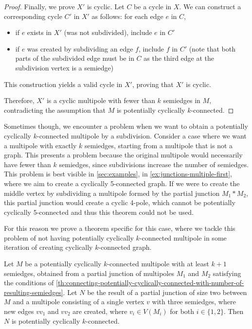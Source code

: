 \documentclass[12pt, twoside]{book}
\begin{document}
\begin{proof}
	Finally, we prove $X'$ is cyclic. Let $C$ be a cycle in $X$. We can construct a corresponding cycle $C'$ in $X'$ as follows: for each edge $e$ in $C$,
	\begin{itemize}
		\item if $e$ exists in $X'$ (was not subdivided), include $e$ in $C'$
		\item if $e$ was created by subdividing an edge $f$, include $f$ in $C'$ (note that both parts of the subdivided edge must be in $C$ as the third edge at the subdivision vertex is a semiedge)
	\end{itemize}
	This construction yields a valid cycle in $X'$, proving that $X'$ is cyclic.
	
	Therefore, $X'$ is a cyclic multipole with fewer than $k$ semiedges in $M$, contradicting the assumption that $M$ is potentially cyclically $k$-connected.
\end{proof}

Sometimes though, we encounter a problem when we want to obtain a potentially cyclically $k$-connected multipole by a subdivision. Consider a case where we want a multipole with exactly $k$ semiedges, starting from a multipole that is not a graph. This presents a problem because the original multipole would necessarily have fewer than $k$ semiedges, since subdivisions increase the number of semiedges. This problem is best visible in \cref{sec:examples}, in \cref{ex:junctions-multiple-first}, where we aim to create a cyclically 5-connected graph. If we were to create the middle vertex by subdividing a multipole formed by the partial junction $M_1*M_2$, this partial junction would create a cyclic 4-pole, which cannot be potentially cyclically 5-connected and thus this theorem could not be used.

For this reason we prove a theorem specific for this case, where we tackle this problem of not having potentially cyclically $k$-connected multipole in some iteration of creating cyclically $k$-connected graph.

\begin{lemma}\label{lem:adding-point-to-partial-junction-of-two}
	Let $M$ be a potentially cyclically $k$-connected multipole with at least $k+1$ semiedges, obtained from a partial junction of multipoles $M_1$ and $M_2$ satisfying the conditions of \cref{th:connecting-potentially-cyclically-connected-with-number-of-resulting-semiedges}. Let $N$ be the result of a partial junction of size two between $M$ and a multipole consisting of a single vertex $v$ with three semiedges, where new edges $vv_1$ and $vv_2$ are created, where $v_i\in V(M_i)$ for both $i\in\{1,2\}$. Then $N$ is potentially cyclically $k$-connected.
\end{lemma}
\end{document}

